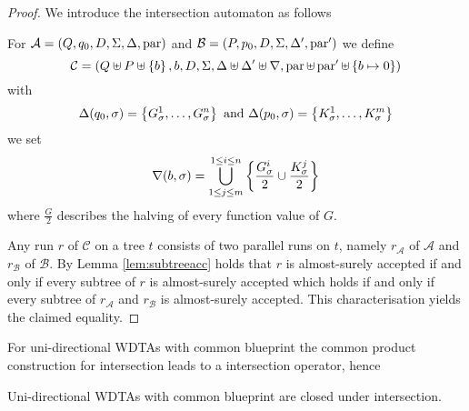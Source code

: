 \begin{proof}
  We introduce the intersection automaton as follows
  \begin{definition}
    For $\mathcal{A} = \left(Q, q_{0}, D, \Sigma, \Delta, \operatorname{par}\right)$ and
    $\mathcal{B} = \left(P, p_{0}, D, \Sigma, \Delta', \operatorname{par}'\right)$ we define
    \begin{equation*}
      \mathcal{C} = \left(Q\uplus P\uplus\left\{b\right\}, b, D, \Sigma,
      \Delta\uplus\Delta'\uplus\nabla, \operatorname{par}\uplus\operatorname{par}'\uplus
      \left\{b\mapsto 0\right\}\right)
    \end{equation*}
    with
    \begin{equation*}
      \Delta(q_{0},\sigma) = \left\{G_{\sigma}^{1},\dots,G_{\sigma}^{n}\right\}
      \text{ and }
      \Delta(p_{0},\sigma) = \left\{K_{\sigma}^{1},\dots,K_{\sigma}^{m}\right\}
    \end{equation*}
    we set
    \begin{equation*}
      \nabla(b,\sigma) = \bigcup^{1\leq i\leq n}_{1\leq j\leq m}\left\{
        \frac{G_{\sigma}^{i}}{2} \cup \frac{K_{\sigma}^{j}}{2}\right\}
    \end{equation*}
    where $\frac{G}{2}$ describes the halving of every function value of $G$.
  \end{definition}
  Any run $r$ of $\mathcal{C}$ on a tree $t$ consists of two parallel runs on
  $t$, namely $r_{\mathcal{A}}$ of $\mathcal{A}$ and $r_{\mathcal{B}}$ of
  $\mathcal{B}$. By Lemma \ref{lem:subtreeacc} holds that $r$ is almost-surely
  accepted if and only if every subtree of $r$ is almost-surely accepted which
  holds if and only if every subtree of $r_{\mathcal{A}}$ and $r_{\mathcal{B}}$
  is almost-surely accepted. This characterisation yields the claimed equality.
\end{proof}
For uni-directional \acp{WDTA} with common blueprint the common product
construction for intersection leads to a intersection operator, hence
\begin{proposition}
  Uni-directional \acp{WDTA} with common blueprint are closed under
  intersection.
\end{proposition}

